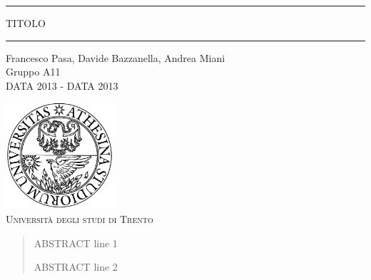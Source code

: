 \begin{titlepage}
\begin{center}

	\hrule \vspace{0.5cm}
     	\textsc{\LARGE TITOLO}
	\vspace{0.5cm} \hrule \vspace{2cm}

      	{\large Francesco Pasa, Davide Bazzanella, Andrea Miani\\
		Gruppo A11}\\
	\vspace{0.5cm}
      	{\large DATA 2013 - DATA 2013}
	\vfill

	\includegraphics[width=4cm]{unitn_logo.png}\\
	\vspace{1cm}
        \textsc{\Large Università degli studi di Trento}
	\vfill

	{\begin{abstract}
ABSTRACT line 1

ABSTRACT line 2
	 \end{abstract}}
\end{center}
\end{titlepage}

\newpage

\vspace*{\fill}
\begin{center}
	\tableofcontents
\end{center}
\vspace*{\fill}
